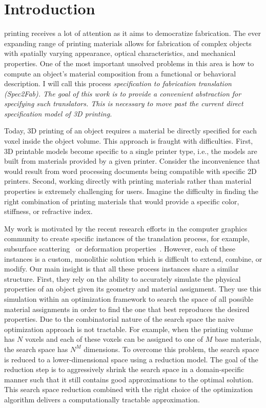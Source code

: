 
\renewcommand{\figdir}{figures/chap1}
%
\chapter{Introduction}
\label{chap:intro}
%
 printing receives a lot of attention as it aims to democratize fabrication.
The ever expanding range of printing materials allows for fabrication of complex objects with spatially varying appearance, optical characteristics, and mechanical properties.
One of the most important unsolved problems in this area is how to compute an object's material composition from a functional or behavioral description. I will call this process \em specification to fabrication translation (Spec2Fab). 
The goal of this work is to provide a convenient abstraction for specifying such translators. This is necessary to move past the current direct specification model of 3D printing.

Today,  3D printing of an object requires a material be directly specified for each voxel inside the object volume. This approach is fraught with difficulties. First, 3D printable models become specific to a single printer type, i.e., the models are built from materials provided by a given printer. Consider the inconvenience that would result from  word processing documents being compatible with specific 2D printers. Second, working directly with printing materials rather than material properties is extremely challenging for users. Imagine the difficulty in finding the right combination of printing materials that would provide a specific color, stiffness, or refractive index.

My work is motivated by the recent research efforts in the computer graphics community to create specific instances of the translation process, for example, subsurface scattering~\cite{Hasan:2010:PRO,Dong:2010:FSS} or deformation properties~\cite{Bickel:2010:DAF}. However, each of these instances is a custom, monolithic solution which is difficult to extend, combine, or modify. Our main insight is that all these process instances share a similar structure. First, they rely on the ability to accurately simulate the physical properties of an object given its geometry and material assignment. They use this simulation within an optimization framework to search the space of all possible material assignments in order to find the one that best reproduces the desired properties. Due to the combinatorial nature of the search space the naive optimization approach is not tractable. For example, when the printing volume has $N$ voxels and each of these voxels can be assigned to one of $M$ base materials, the search space has $N^M$ dimensions. To overcome this problem, the search space is reduced to a lower-dimensional space using a reduction model. The goal of the reduction step is to aggressively shrink the search space in a domain-specific manner such that it still contains good approximations to the optimal solution. This search space reduction combined with the right choice of the optimization algorithm delivers a computationally tractable approximation.

